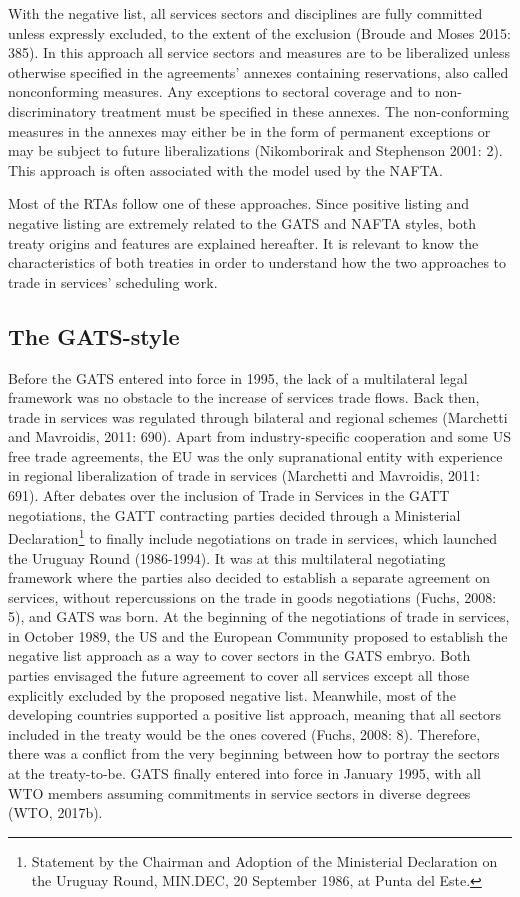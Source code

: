 \documentclass{article}
\begin{document}
\smallskip

With the negative list, all services sectors and disciplines are fully committed unless expressly excluded, to the extent of the exclusion (Broude and Moses 2015: 385). In this approach all service sectors and measures are to be liberalized unless otherwise specified in the agreements' annexes containing reservations, also called nonconforming measures. Any exceptions to sectoral coverage and to non-discriminatory treatment must be specified in these annexes. The non-conforming measures in the annexes may either be in the form of permanent exceptions or may be subject to future liberalizations (Nikomborirak and Stephenson 2001: 2). This approach is often associated with the model used by the NAFTA.

\smallskip

Most of the RTAs follow one of these approaches. Since positive listing and negative listing are extremely related to the GATS and NAFTA styles, both treaty origins and features are explained hereafter. It is relevant to know the characteristics of both treaties in order to understand how the two approaches to trade in services’ scheduling work.

\subsection{The GATS-style}

Before the GATS entered into force in 1995, the lack of a multilateral legal framework was no obstacle to the increase of services trade flows. Back then, trade in services was regulated through bilateral and regional schemes (Marchetti and Mavroidis, 2011: 690). Apart from industry-specific cooperation and some US free trade agreements, the EU was the only supranational entity with experience in regional liberalization of trade in services (Marchetti and Mavroidis, 2011: 691). After debates over the inclusion of Trade in Services in the GATT negotiations, the GATT contracting parties decided through a Ministerial Declaration\footnote{Statement by the Chairman and Adoption of the Ministerial Declaration on the Uruguay Round, MIN.DEC, 20 September 1986, at Punta del Este.} to finally include negotiations on trade in services, which launched the Uruguay Round (1986-1994). It was at this multilateral negotiating framework where the parties also decided to establish a separate agreement on services, without repercussions on the trade in goods negotiations (Fuchs, 2008: 5), and GATS was born. At the beginning of the negotiations of trade in services, in October 1989, the US and the European Community proposed to establish the negative list approach as a way to cover sectors in the GATS embryo. Both parties envisaged the future agreement to cover all services except all those explicitly excluded by the proposed negative list. Meanwhile, most of the developing countries supported a positive list approach, meaning that all sectors included in the treaty would be the ones covered (Fuchs, 2008: 8). Therefore, there was a conflict from the very beginning between how to portray the sectors at the treaty-to-be. GATS finally entered into force in January 1995, with all WTO members assuming commitments in service sectors in diverse degrees (WTO, 2017b).
\end{document}

